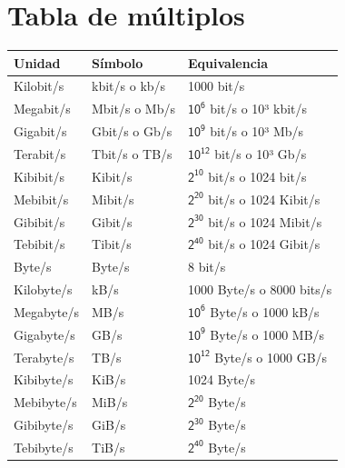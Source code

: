 \documentclass[a4paper, 11pt]{report} %
\begin{document}
\section*{Tabla de múltiplos}
\noindent
\begin{tabularx}{\columnwidth}{| l >{\centering}X X|}
\rowcolor{header} \hline
\textbf{Unidad} & \textbf{Símbolo} & \textbf{Equivalencia} \\ \hline
Kilobit/s & kbit/s o kb/s & 1000 bit/s \\
Megabit/s & Mbit/s o Mb/s & $\mathsf{10^{6}}$ bit/s o 10³ kbit/s  \\
Gigabit/s & Gbit/s o Gb/s & $\mathsf{10^{9}}$ bit/s o 10³ Mb/s \\
Terabit/s & Tbit/s o TB/s & $\mathsf{10^{12}}$ bit/s o 10³ Gb/s \\ \hline
Kibibit/s & Kibit/s & $\mathsf{2^{10}}$ bit/s o 1024 bit/s \\
Mebibit/s & Mibit/s & $\mathsf{2^{20}}$ bit/s o 1024 Kibit/s \\
Gibibit/s & Gibit/s & $\mathsf{2^{30}}$ bit/s o 1024 Mibit/s \\
Tebibit/s & Tibit/s & $\mathsf{2^{40}}$ bit/s o 1024 Gibit/s \\ \hline \hline
Byte/s    & Byte/s & 8 bit/s \\
Kilobyte/s & kB/s & 1000 Byte/s o 8000 bits/s \\
Megabyte/s & MB/s & $\mathsf{10^{6}}$ Byte/s o 1000 kB/s \\
Gigabyte/s & GB/s & $\mathsf{10^{9}}$ Byte/s o 1000 MB/s \\
Terabyte/s & TB/s & $\mathsf{10^{12}}$ Byte/s o 1000 GB/s \\ \hline
Kibibyte/s & KiB/s & 1024 Byte/s \\
Mebibyte/s & MiB/s & $\mathsf{2^{20}}$ Byte/s \\
Gibibyte/s & GiB/s & $\mathsf{2^{30}}$ Byte/s \\
Tebibyte/s & TiB/s & $\mathsf{2^{40}}$ Byte/s \\ \hline
\end{tabularx}



\newpage
\thispagestyle{empty}
\vspace*{\fill}
\doclicenseThis
\vspace*{\fill}
\end{document}
